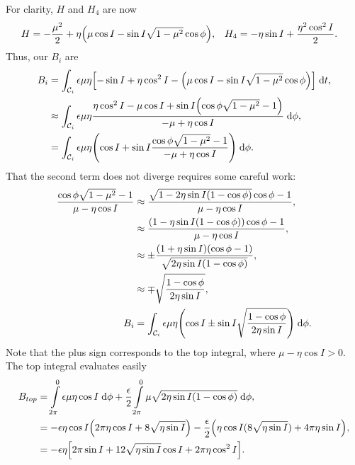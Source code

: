 \documentclass[11pt,
        usenames, %
        dvipsnames %
    ]{article}
\DeclarePairedDelimiter\p{\lparen}{\rparen}
\DeclarePairedDelimiter\s{\lbrack}{\rbrack}
\begin{document}
For clarity, $H$ and $H_4$ are now
\begin{align*}
    H &= -\frac{\mu^2}{2}
            + \eta\p*{\mu \cos I - \sin I \sqrt{1 - \mu^2}\cos \phi}, &
    H_4 &= -\eta \sin I + \frac{\eta^2 \cos^2 I}{2}.
\end{align*}
Thus, our $B_i$ are
\begin{align*}
    B_i &= \int_{\mathcal{C}_i} \epsilon \mu \eta
            \s*{-\sin I + \eta \cos^2 I -
                \p*{\mu \cos I - \sin I \sqrt{1 - \mu^2}\cos \phi}}
            \;\mathrm{d}t,\\
        &\approx \int_{\mathcal{C}_i} \epsilon \mu \eta
            \frac{\eta \cos^2 I - \mu \cos I
                + \sin I\p*{\cos \phi \sqrt{1 - \mu^2} - 1}}{-\mu + \eta \cos I}
            \;\mathrm{d}\phi,\\
        &= \int_{\mathcal{C}_i} \epsilon \mu \eta
            \p*{\cos I + \sin I \frac{\cos \phi \sqrt{1 - \mu^2} - 1}{-\mu +
            \eta \cos I}} \;\mathrm{d}\phi.
\end{align*}
That the second term does not diverge requires some careful work:
\begin{align*}
    \frac{\cos \phi\sqrt{1 - \mu^2} - 1}{\mu - \eta \cos I}
        &\approx \frac{\sqrt{1 - 2\eta \sin I\p*{1 - \cos \phi}}\cos \phi
            - 1}{\mu - \eta \cos I},\\
        &\approx \frac{(1 - \eta \sin I(1 - \cos \phi))\cos \phi - 1}{
            \mu - \eta \cos I},\\
        &\approx \pm\frac{(1 + \eta \sin I)(\cos \phi - 1)}{\sqrt{2\eta \sin I
            (1 - \cos \phi)}},\\
        &\approx \mp\sqrt{\frac{1 - \cos \phi}{2\eta \sin I}},\\
    B_i &= \int_{\mathcal{C}_i} \epsilon \mu \eta
            \p*{\cos I \pm \sin I
                \sqrt{\frac{1 - \cos \phi}{2\eta \sin I}}} \;\mathrm{d}\phi.
\end{align*}
Note that the plus sign corresponds to the top integral, where $\mu - \eta \cos
I > 0$. The top integral evaluates easily
\begin{align*}
    B_{top} &= \int\limits_{2\pi}^0 \epsilon \mu \eta \cos I\;\mathrm{d}\phi
            + \frac{\epsilon}{2}\int\limits_{2\pi}^0
                \mu\sqrt{2\eta \sin I\p*{1 - \cos \phi}}\;\mathrm{d}\phi,\\
        &= -\epsilon \eta \cos I\p*{2\pi \eta \cos I + 8\sqrt{\eta \sin I}}
            - \frac{\epsilon}{2}\p*{\eta \cos I (8\sqrt{\eta \sin I})
            + 4\pi \eta \sin I},\\
        &= -\epsilon \eta \s*{
            2\pi \sin I + 12\sqrt{\eta \sin I}\cos I + 2\pi \eta \cos^2 I}.
\end{align*}
\end{document}
